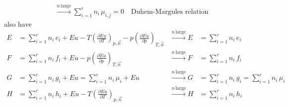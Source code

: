 \begin{thm}
\begin{align*}
        &\xrightarrow{n \, \text{large}} \sum_{i=1}^r n_i \, \mu_{i,j} = 0
        \quad \boxed{\text{Duhem-Margules relation}}
    \end{align*}
    also have
    \begin{align*}
        E &= \sum_{i=1}^r n_i \, e_i + E u - T \left( \frac{\partial E u}{\partial T} \right)_{p,\vec{n}} 
        - p \left( \frac{\partial E u}{\partial p} \right)_{T,\vec{n}} 
        &\xrightarrow{n \, \text{large}}E &= \sum_{i=1}^r n_i \, e_i \\
        F &= \sum_{i=1}^r n_i \, f_i + E u - p \left( \frac{\partial E u}{\partial p} \right)_{T,\vec{n}} 
        &\xrightarrow{n \, \text{large}}F &= \sum_{i=1}^r n_i \, f_i \\
        G &= \sum_{i=1}^r n_i \, g_i + E u = \sum_{i=1}^r n_i \, \mu_i + E u 
        &\xrightarrow{n \, \text{large}}G &= \sum_{i=1}^r n_i \, g_i = \sum_{i=1}^r n_i \, \mu_i \\
        H &= \sum_{i=1}^r n_i \, h_i + E u - T \left( \frac{\partial E u}{\partial T} \right)_{p,\vec{n}} 
        &\xrightarrow{n \, \text{large}}H &= \sum_{i=1}^r n_i \, h_i
    \end{align*}
\end{thm}











\ifx\allfiles\undefined

\fi
